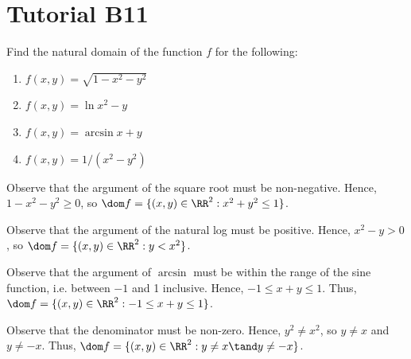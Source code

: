 \section{Tutorial B11}

\begin{problem}
    Find the natural domain of the function $f$ for the following:
    \begin{enumerate}
        \item $f(x, y) = \sqrt{1 - x^2 - y^2}$
        \item $f(x, y) = \ln{x^2 - y}$
        \item $f(x, y) = \arcsin{x + y}$
        \item $f(x, y) = 1/(x^2 - y^2)$
    \end{enumerate}
\end{problem}
\begin{solution}
    \begin{ppart}
        Observe that the argument of the square root must be non-negative. Hence, $1 - x^2 - y^2 \geq 0$, so $\dom f = \{ (x, y) \in \RR^2 : x^2 + y^2 \leq 1\}$.
    \end{ppart}
    \begin{ppart}
        Observe that the argument of the natural log must be positive. Hence, $x^2 - y > 0$, so $\dom f = \{(x, y) \in \RR^2 : y < x^2\}$.
    \end{ppart}
    \begin{ppart}
        Observe that the argument of $\arcsin$ must be within the range of the sine function, i.e. between $-1$ and 1 inclusive. Hence, $-1 \leq x + y \leq 1$. Thus, $\dom f = \{(x, y) \in \RR^2 : -1 \leq x + y \leq 1\}$.
    \end{ppart}
    \begin{ppart}
        Observe that the denominator must be non-zero. Hence, $y^2 \neq x^2$, so $y \neq x$ and $y \neq -x$. Thus, $\dom f = \{(x, y) \in \RR^2 : y \neq x \tand y \neq -x\}$.
    \end{ppart}
\end{solution}


